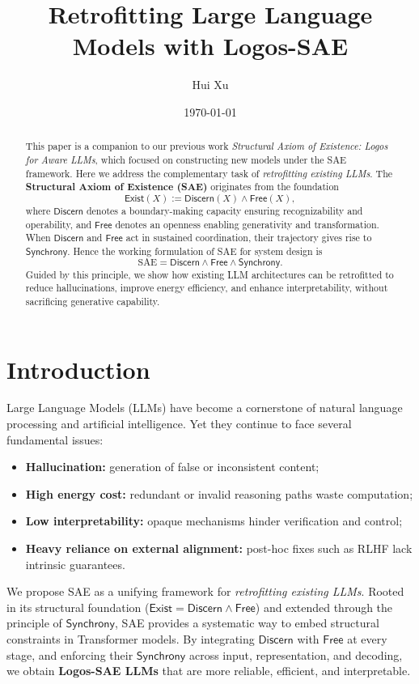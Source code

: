 \documentclass[11pt]{article}
\title{\vspace{-0.5em}\textbf{Retrofitting Large Language Models with Logos-SAE}\vspace{-0.3em}}
\author{Hui Xu}
\date{\small\today}
\theoremstyle{plain}
\theoremstyle{definition}
\theoremstyle{remark}
\newcommand{\Exist}{\ensuremath{\mathsf{Exist}}}
\newcommand{\Discern}{\ensuremath{\mathsf{Discern}}}
\newcommand{\Free}{\ensuremath{\mathsf{Free}}}
\newcommand{\Synchrony}{\ensuremath{\mathsf{Synchrony}}}
\begin{document}
\maketitle
\thispagestyle{firstpage}

\begin{abstract}
This paper is a companion to our previous work \emph{Structural Axiom of Existence: Logos for Aware LLMs}, which focused on constructing new models under the SAE framework. Here we address the complementary task of \emph{retrofitting existing LLMs}. The \textbf{Structural Axiom of Existence (SAE)} originates from the foundation
\[
\Exist(X) := \Discern(X) \wedge \Free(X),
\]
where \Discern{} denotes a boundary-making capacity ensuring recognizability and operability, and \Free{} denotes an openness enabling generativity and transformation. When \Discern{} and \Free{} act in sustained coordination, their trajectory gives rise to \Synchrony{}. Hence the working formulation of SAE for system design is
\[
\text{SAE} = \Discern \wedge \Free \wedge \Synchrony.
\]
Guided by this principle, we show how existing LLM architectures can be retrofitted to reduce hallucinations, improve energy efficiency, and enhance interpretability, without sacrificing generative capability.
\end{abstract}

\section{Introduction}

Large Language Models (LLMs) have become a cornerstone of natural language processing and artificial intelligence. Yet they continue to face several fundamental issues:
\begin{itemize}
  \item \textbf{Hallucination:} generation of false or inconsistent content;
  \item \textbf{High energy cost:} redundant or invalid reasoning paths waste computation;
  \item \textbf{Low interpretability:} opaque mechanisms hinder verification and control;
  \item \textbf{Heavy reliance on external alignment:} post-hoc fixes such as RLHF lack intrinsic guarantees.
\end{itemize}

We propose SAE as a unifying framework for \emph{retrofitting existing LLMs}.  
Rooted in its structural foundation (\(\Exist = \Discern \wedge \Free\)) and extended through the principle of \Synchrony{}, SAE provides a systematic way to embed structural constraints in Transformer models. By integrating \Discern{} with \Free{} at every stage, and enforcing their \Synchrony{} across input, representation, and decoding, we obtain \textbf{Logos-SAE LLMs} that are more reliable, efficient, and interpretable.
\end{document}

